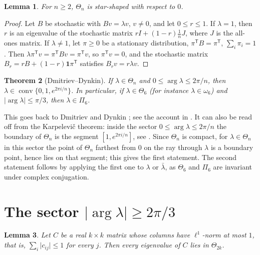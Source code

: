 \documentclass[11pt]{amsart}
\newtheorem{theorem}{Theorem}[section]
\newtheorem{lemma}[theorem]{Lemma}
\theoremstyle{definition}
\theoremstyle{remark}
\newcommand{\conv}{\operatorname{conv}}
\begin{document}
\begin{lemma}\label{lem:star}
For $n\ge2$, $\Theta_n$ is star-shaped with respect to $0$.
\end{lemma}

\begin{proof}
Let $B$ be stochastic with $Bv=\lambda v$, $v\neq0$, and let $0\le r\le1$. If $\lambda=1$, then $r$ is an eigenvalue of the stochastic matrix $rI+(1-r)\frac1nJ$, where $J$ is the all-ones matrix. If $\lambda\neq1$, let $\pi\ge0$ be a stationary distribution, $\pi^{\mathsf T}B=\pi^{\mathsf T}$, $\sum_i\pi_i=1$. Then $\lambda\pi^{\mathsf T}v=\pi^{\mathsf T}Bv=\pi^{\mathsf T}v$, so $\pi^{\mathsf T}v=0$, and the stochastic matrix $B_r=rB+(1-r)\mathbf 1\pi^{\mathsf T}$ satisfies $B_rv=r\lambda v$.
\end{proof}

\begin{theorem}[Dmitriev--Dynkin]\label{thm:DD}
If $\lambda\in\Theta_n$ and $0\le\arg\lambda\le2\pi/n$, then $\lambda\in\conv\{0,1,e^{2\pi i/n}\}$. In particular, if $\lambda\in\Theta_6$ (for instance $\lambda\in\omega_6$) and $\lvert\arg\lambda\rvert\le\pi/3$, then $\lambda\in\Pi_6$.
\end{theorem}

This goes back to Dmitriev and Dynkin \cite{DD45,DD46}; see the account in \cite[p.~158]{KK22}. It can also be read off from the Karpelevi\v{c} theorem: inside the sector $0\le\arg\lambda\le2\pi/n$ the boundary of $\Theta_n$ is the segment $[1,e^{2\pi i/n}]$, see \cite[Section~4.1]{MNP24}. Since $\Theta_n$ is compact, for $\lambda\in\Theta_n$ in this sector the point of $\Theta_n$ farthest from $0$ on the ray through $\lambda$ is a boundary point, hence lies on that segment; this gives the first statement. The second statement follows by applying the first one to $\lambda$ or $\bar\lambda$, as $\Theta_6$ and $\Pi_6$ are invariant under complex conjugation.

\section{The sector \texorpdfstring{$\lvert\arg\lambda\rvert\ge2\pi/3$}{|arg λ| ≥ 2π/3}}\label{sec:K3}

\begin{lemma}\label{lem:signed}
Let $C$ be a real $k\times k$ matrix whose columns have $\ell^1$-norm at most $1$, that is, $\sum_i\lvert c_{ij}\rvert\le1$ for every $j$. Then every eigenvalue of $C$ lies in $\Theta_{2k}$.
\end{lemma}
\end{document}
